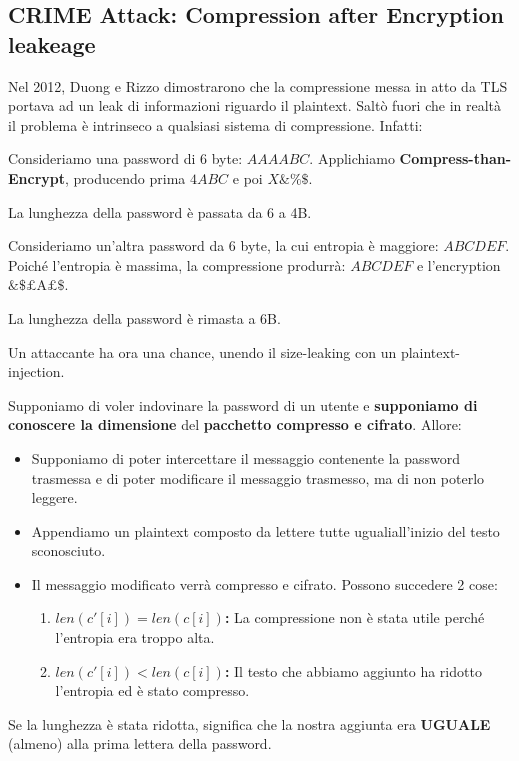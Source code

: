 \subsection{CRIME Attack: Compression after Encryption leakeage}
Nel 2012, Duong e Rizzo dimostrarono che la compressione messa in atto da TLS portava ad un leak di informazioni riguardo il plaintext. Saltò fuori che in realtà il problema è intrinseco a qualsiasi sistema di compressione. Infatti:
\begin{example}
Consideriamo una password di 6 byte: $AAAABC$. Applichiamo \textbf{Compress-than-Encrypt}, producendo prima $4ABC$ e poi $X\&\%\$$.
\begin{remark}
La lunghezza della password è passata da 6 a 4B.
\end{remark}
Consideriamo un'altra password da 6 byte, la cui entropia è maggiore: $ABCDEF$. Poiché l'entropia è massima, la compressione produrrà: $ABCDEF$ e l'encryption $\&\$\text{£A£}\$$.
\begin{remark}
La lunghezza della password è rimasta a 6B.
\end{remark}
\end{example}
Un attaccante ha ora una chance, unendo il size-leaking con un plaintext-injection. 
\begin{definition}\label{def:compcpa}
Supponiamo di voler indovinare la password di un utente e \textbf{supponiamo di conoscere la dimensione} del \textbf{pacchetto compresso e cifrato}. Allore:
\begin{itemize}
    \item Supponiamo di poter intercettare il messaggio contenente la password trasmessa e di poter modificare il messaggio trasmesso, ma di non poterlo leggere.
    \item Appendiamo un plaintext composto da lettere tutte uguali\footnotemark all'inizio del testo sconosciuto.
    \item Il messaggio modificato verrà compresso e cifrato. Possono succedere 2 cose:
    \begin{enumerate}
        \item \textbf{$len(c'[i])=len(c[i])$:} La compressione non è stata utile perché l'entropia era troppo alta.
        \item \textbf{$len(c'[i])<len(c[i])$:} Il testo che abbiamo aggiunto ha ridotto l'entropia ed è stato compresso.
    \end{enumerate}
\end{itemize}
Se la lunghezza è stata ridotta, significa che la nostra aggiunta era \textbf{UGUALE} (almeno) alla prima lettera della password. 
\end{definition}
